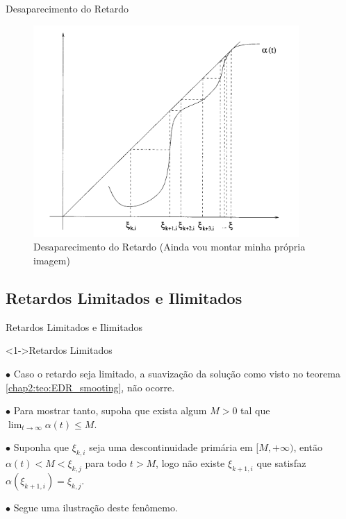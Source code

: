 \documentclass{beamer}
\theoremstyle{plain}
\theoremstyle{definition}
\begin{document}

\begin{frame}{Desaparecimento do Retardo}
    

    \begin{figure}
        \begin{center}
            \includegraphics[width=0.9\textwidth, height=0.7\textheight]{desaparecimento_do_retardo.png}
        \end{center}
        \caption{Desaparecimento do Retardo (Ainda vou montar minha própria imagem)}\label{fig:Desaparecimento do Retardo}
    \end{figure}
        

\end{frame}



\subsection{Retardos Limitados e Ilimitados}
\begin{frame}{Retardos Limitados e Ilimitados}

    \begin{exampleblock}
        <1->{Retardos Limitados}

        $\bullet$ Caso o retardo seja limitado, a suavização da solução como visto no teorema \ref{chap2:teo:EDR_smooting}, não ocorre.


        $\bullet$ Para mostrar tanto, supoha que exista algum $M>0$ tal que \( \lim_{t \to \infty} \alpha(t) \leq M \).

        $\bullet$ Suponha que $\xi_{k, i}$ seja uma descontinuidade primária em $[M, +\infty)$, então $\alpha(t) < M < \xi_{k, j}$ para todo $t > M$, logo não existe $\xi_{k+1, i}$ que satisfaz $\alpha(\xi_{k+1, i}) = \xi_{k, j}$.
        
        $\bullet$ Segue uma ilustração deste fenômemo.

    \end{exampleblock}

\end{frame}
\end{document}
